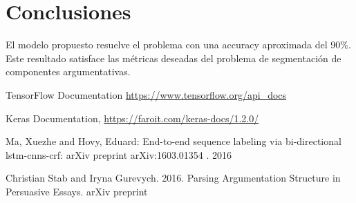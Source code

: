 \documentclass[runningheads]{llncs}
\begin{document}
\section{Conclusiones}

El modelo propuesto resuelve el problema con una accuracy aproximada del 90\%. Este
resultado satisface las métricas deseadas del problema de segmentación de componentes
argumentativas. 

\begin{thebibliography}{8}

TensorFlow Documentation \url{https://www.tensorflow.org/api_docs} 

Keras Documentation, \url{https://faroit.com/keras-docs/1.2.0/}

Ma, Xuezhe and Hovy, Eduard:
End-to-end sequence labeling via bi-directional lstm-cnns-crf:
arXiv preprint arXiv:1603.01354 . 2016 

Christian Stab and Iryna Gurevych. 2016. Parsing Argumentation Structure in 
Persuasive Essays. arXiv preprint

\end{thebibliography}
\end{document}
